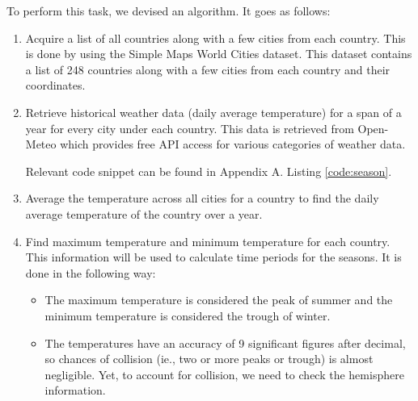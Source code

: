 To perform this task, we devised an algorithm. It goes as follows:
\begin{enumerate}
    \item Acquire a list of all countries along with a few cities from each country. This is done by using the Simple Maps World Cities dataset\cite{world_cities}. This dataset contains a list of 248 countries along with a few cities from each country and their coordinates.
    \item Retrieve historical weather data (daily average temperature) for a span of a year for every city under each country. This data is retrieved from Open-Meteo\cite{Zippenfenig_Open-Meteo} which provides free API access for various categories of weather data.

    Relevant code snippet can be found in Appendix A. Listing \ref{code:season}.
    \item Average the temperature across all cities for a country to find the daily average temperature of the country over a year.
    \item Find maximum temperature and minimum temperature for each country. This information will be used to calculate time periods for the seasons. It is done in the following way:
    \begin{itemize}
        \item The maximum temperature is considered the peak of summer and the minimum temperature is considered the trough of winter.
        \item The temperatures have an accuracy of 9 significant figures after decimal, so chances of collision (ie., two or more peaks or trough) is almost negligible. Yet, to account for collision, we need to check the hemisphere information.


\end{itemize}
\end{enumerate}
